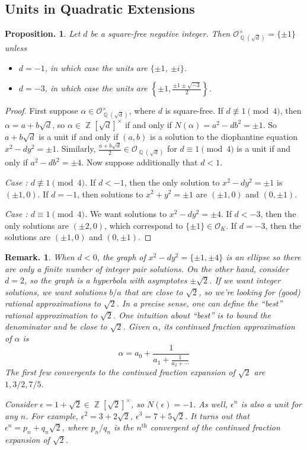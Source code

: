 \documentclass[11pt, a4paper]{memoir}
\DeclareMathOperator{\Q}{{\mathbb{Q}}}
\DeclareMathOperator{\Z}{{\mathbb{Z}}}
\theoremstyle{change}
\newtheorem{proposition}[theorem]{Proposition.}
\theoremstyle{plain}
\newcounter{casect}
\newcommand{\case}[1]{\stepcounter{casect}\textit{Case \thecasect: #1.}}
\theoremstyle{nonumberplain}
\newtheorem{remark}{Remark.}
\newtheorem{proof}{Proof}
\numberwithin{equation}{section}
\begin{document}
\subsection{Units in Quadratic Extensions}
\begin{proposition}
    Let $d$ be a square-free negative integer.
    Then $\mathcal{O}_{\Q(\sqrt{d})}^\times=\{\pm 1\}$ unless
    \begin{itemize}[nolistsep]
        \item $d=-1$, in which case the units are $\{\pm 1$, $\pm i\}$.
        \item $d=-3$, in which case the units are $\left\{\pm 1,\frac{\pm 1\pm\sqrt{-3}}{2}\right\}$.
    \end{itemize}
\end{proposition}
\begin{proof}
    First suppose $\alpha\in\mathcal{O}_{\Q(\sqrt{d})}^\times$, where $d$ is square-free.
    If $d\nequiv 1\pmod{4}$, then $\alpha=a+b\sqrt{d}$, so $\alpha\in\Z[\sqrt{d}]^\times$ if and only if $N(\alpha)=a^2-db^2=\pm 1$.
    So $a+b\sqrt{d}$ is a unit if and only if $(a,b)$ is a solution to the diophantine equation $x^2-dy^2=\pm1$.
    Similarly, $\frac{a+b\sqrt{d}}{2}\in\mathcal{O}_{\Q(\sqrt{d})}$ for $d\equiv 1\pmod{4}$ is a unit if and only if $a^2-db^2=\pm 4$.
    Now suppose additionally that $d<1$.

    \case{$d\nequiv 1\pmod{4}$}
    If $d<-1$, then the only solution to $x^2-dy^2=\pm 1$ is $(\pm 1,0)$.
    If $d=-1$, then solutions to $x^2+y^2=\pm 1$ are $(\pm 1,0)$ and $(0,\pm 1)$.

    \case{$d\equiv 1\pmod{4}$}
    We want solutions to $x^2-dy^2=\pm 4$.
    If $d<-3$, then the only solutions are $(\pm 2,0)$, which correspond to $\{\pm 1\}\in\mathcal{O}_K$.
    If $d=-3$, then the solutions are $(\pm 1,0)$ and $(0,\pm 1)$.
\end{proof}
\begin{remark}
    When $d<0$, the graph of $x^2-dy^2=\{\pm 1,\pm 4\}$ is an ellipse so there are only a finite number of integer pair solutions.
    On the other hand, consider $d=2$, so the graph is a hyperbola with asymptotes $\pm\sqrt{2}$.
    If we want integer solutions, we want solutions $b/a$ that are close to $\sqrt{2}$, so we're looking for (good) rational approximations to $\sqrt{2}$.
    In a precise sense, one can define the ``best'' rational approximation to $\sqrt{2}$.
    One intuition about ``best'' is to bound the denominator and be close to $\sqrt{2}$.
    Given $\alpha$, its continued fraction approximation of $\alpha$ is
    \begin{equation*}
        \alpha=a_0+\frac{1}{a_1+\frac{1}{a_2+\cdots}}
    \end{equation*}
    The first few convergents to the continued fraction expansion of $\sqrt{2}$ are $1,3/2,7/5$.

    Consider $\epsilon=1+\sqrt{2}\in\Z[\sqrt{2}]^\times$, so $N(\epsilon)=-1$.
    As well, $\epsilon^n$ is also a unit for any $n$.
    For example, $\epsilon^2=3+2\sqrt{2}$, $\epsilon^3=7+5\sqrt{2}$.
    It turns out that $\epsilon^n=p_n+q_n\sqrt{2}$, where $p_n/q_n$ is the $n^\text{th}$ convergent of the continued fraction expansion of $\sqrt{2}$.
\end{remark}
\end{document}

